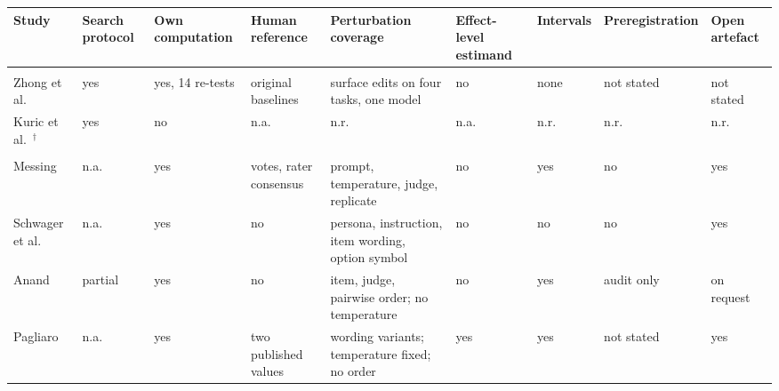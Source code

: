 \begin{tabular}{@{}>{\raggedright\arraybackslash}p{2.25cm}>{\raggedright\arraybackslash}p{1.2cm}>{\raggedright\arraybackslash}p{1.55cm}>{\raggedright\arraybackslash}p{1.95cm}>{\raggedright\arraybackslash}p{2.9cm}>{\raggedright\arraybackslash}p{1.3cm}>{\raggedright\arraybackslash}p{1.25cm}>{\raggedright\arraybackslash}p{1.25cm}>{\raggedright\arraybackslash}p{1.2cm}@{}}
\toprule
Study & Search protocol & Own computation & Human reference & Perturbation coverage & Effect-level estimand & Intervals & Prereg\-istration & Open artefact \\
\midrule
\multicolumn{9}{@{}l}{\emph{Reviews}}\\
Zhong et al.\ \cite{zhong2026review} & yes & yes, 14 re-tests & original baselines & surface edits on four tasks, one model & no & none & not stated & not stated \\
Kuric et al.\ \cite{kuric2026synthetic}$^{\dagger}$ & yes & no & n.a. & n.r. & n.a. & n.r. & n.r. & n.r. \\
\midrule
\multicolumn{9}{@{}l}{\emph{Computations}}\\
Messing \cite{messing2026hidden} & n.a. & yes & votes, rater consensus & prompt, temperature, judge, replicate & no & yes & no & yes \\
Schwager et al.\ \cite{schwager2026unsampled} & n.a. & yes & no & persona, instruction, item wording, option symbol & no & no & no & yes \\
Anand \cite{anand2026which} & partial & yes & no & item, judge, pairwise order; no temperature & no & yes & audit only & on request \\
Pagliaro \cite{pagliaro2026biases} & n.a. & yes & two published values & wording variants; temperature fixed; no order & yes & yes & not stated & yes \\

\end{tabular}
